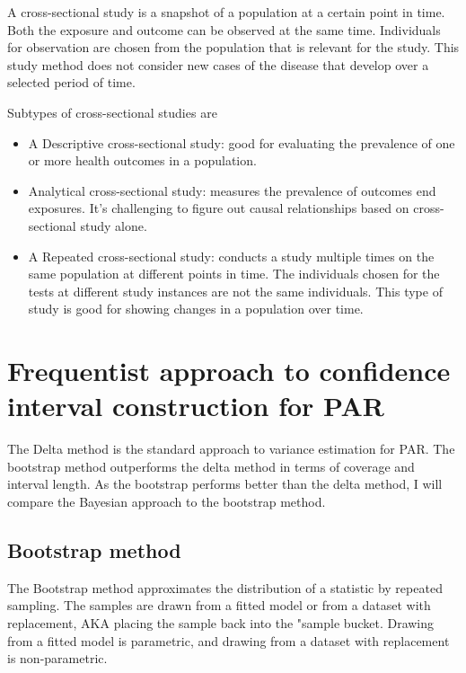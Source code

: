 A cross-sectional study is a snapshot of a population at a certain point in time. Both the exposure and outcome can be observed at the same time. Individuals for observation are chosen from the population that is relevant for the study. This study method does not consider new cases of the disease that develop over a selected period of time. 

Subtypes of cross-sectional studies are
\begin{itemize}
    \item A Descriptive cross-sectional study: good for evaluating the prevalence of one or more health outcomes in a population.
    \item Analytical cross-sectional study: measures the prevalence of outcomes end exposures. It's challenging to figure out causal relationships based on cross-sectional study alone. 
    \item A Repeated cross-sectional study: conducts a study multiple times on the same population at different points in time. The individuals chosen for the tests at different study instances are not the same individuals. This type of study is good for showing changes in a population over time.
\end{itemize} \cite{Wang2020CrossSectionalSS} 

\section{Frequentist approach to confidence interval construction for PAR}\label{FrequentistApproach}

The Delta method is the standard approach to variance estimation for PAR. The bootstrap method outperforms the delta method in terms of coverage and interval length. \cite{Pirikahu2016BayesianMO} As the bootstrap performs better than the delta method, I will compare the Bayesian approach to the bootstrap method.

\subsection{Bootstrap method}\label{Bootstrap}

The Bootstrap method approximates the distribution of a statistic by repeated sampling. The samples are drawn from a fitted model or from a dataset with replacement, AKA placing the sample back into the "sample bucket. Drawing from a fitted model is parametric, and drawing from a dataset with replacement is non-parametric. 

